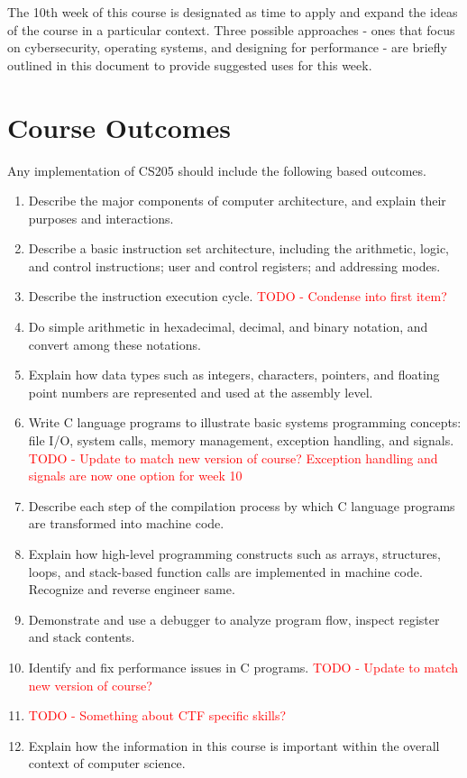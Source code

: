 \documentclass[12pt,letterpaper]{article}
\begin{document}
	The 10th week of this course is designated as time to apply and expand the ideas of the course in a particular context. Three possible approaches - ones that focus on cybersecurity, operating systems, and designing for performance - are briefly outlined in this document to provide suggested uses for this week.
	\clearpage

	
	\section{Course Outcomes}

	Any implementation of CS205 should include the following based outcomes.

	\begin{enumerate}
		\item Describe the major components of computer architecture, and explain their purposes and interactions.
		\item Describe a basic instruction set architecture, including the arithmetic, logic, and control instructions; user and control registers; and addressing modes.
		\item Describe the instruction execution cycle. \textcolor{red}{TODO - Condense into first item?}
		\item Do simple arithmetic in hexadecimal, decimal, and binary notation, and convert among these notations.
		\item Explain how data types such as integers, characters, pointers, and floating point numbers are represented and used at the assembly level.
		\item Write C language programs to illustrate basic systems programming concepts: file I/O, system calls, memory management, exception handling, and signals. \textcolor{red}{TODO - Update to match new version of course? Exception handling and signals are now one option for week 10}
		\item Describe each step of the compilation process by which C language programs are transformed into machine code.  
		\item Explain how high-level programming constructs such as arrays, structures, loops, and stack-based function calls are implemented in  machine code. Recognize and reverse engineer same.
		\item Demonstrate and use a debugger to analyze program flow, inspect register and stack contents. 
		\item Identify and fix performance issues in C programs. \textcolor{red}{TODO - Update to match new version of course?}
		\item \textcolor{red}{TODO - Something about CTF specific skills?}
		\item Explain how the information in this course is important within the overall context of computer science.
	\end{enumerate}
\end{document}
